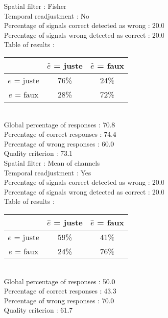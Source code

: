 Spatial filter : Fisher \\
Temporal readjustment : No \\
Percentage of signals correct detected as wrong :   20.0 \\
Percentage of signals wrong detected as correct :   20.0 \\
Table of results : \\
\begin{tabular}{|c|c|c|}
\hline				& $\hat{e}$ = juste & $\hat{e}$ = faux \\
\hline  $e$ = juste	&     76\%			&     24\%		\\
\hline  $e$ = faux	&     28\%			&     72\%		\\
\hline
\end{tabular}\\
Global percentage of responses :   70.8 \\
Percentage of correct responses :   74.4 \\
Percentage of wrong responses :   60.0 \\
Quality criterion :   73.1 \\

Spatial filter : Mean of channels \\
Temporal readjustment : Yes \\
Percentage of signals correct detected as wrong :   20.0 \\
Percentage of signals wrong detected as correct :   20.0 \\
Table of results : \\
\begin{tabular}{|c|c|c|}
\hline				& $\hat{e}$ = juste & $\hat{e}$ = faux \\
\hline  $e$ = juste	&     59\%			&     41\%		\\
\hline  $e$ = faux	&     24\%			&     76\%		\\
\hline
\end{tabular}\\
Global percentage of responses :   50.0 \\
Percentage of correct responses :   43.3 \\
Percentage of wrong responses :   70.0 \\
Quality criterion :   61.7 \\

